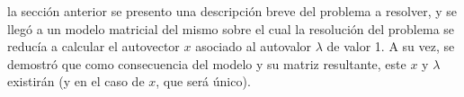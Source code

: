 \par {} la secci\'on anterior se presento una descripci\'on
breve del problema a resolver, y se lleg\'o a un modelo matricial del mismo
sobre el cual la resoluci\'on del problema se reduc\'ia a calcular el autovector
$x$ asociado al autovalor $\lambda$ de valor 1. A su vez, se demostr\'o que como
consecuencia del modelo y su matriz resultante, este $x$ y $\lambda$ existir\'an
(y en el caso de $x$, que ser\'a \'unico).


